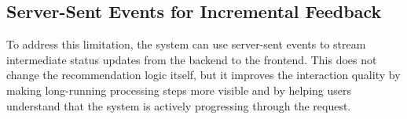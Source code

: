 \subsection{Server-Sent Events for Incremental Feedback}\label{subsection:system-architecture:sse}
To address this limitation, the system can use server-sent events to stream intermediate status updates from the backend to the frontend. This does not change the recommendation logic itself, but it improves the interaction quality by making long-running processing steps more visible and by helping users understand that the system is actively progressing through the request.
